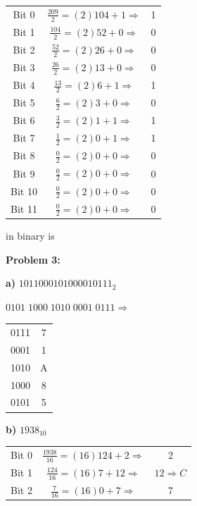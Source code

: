 \documentclass{article}
\begin{document}
    \begin{center}
        \begin{tabular}{ c|c c }
            Bit 0 & $\frac{209}{2} = (2)104 + 1 \Rightarrow$ & 1 \\
            Bit 1 & $\frac{104}{2} = (2)52 + 0 \Rightarrow$ & 0 \\
            Bit 2 & $\frac{52}{2} = (2)26 + 0 \Rightarrow$ & 0 \\
            Bit 3 & $\frac{26}{2} = (2)13 + 0 \Rightarrow$ & 0 \\
            Bit 4 & $\frac{13}{2} = (2)6 + 1 \Rightarrow$ & 1 \\
            Bit 5 & $\frac{6}{2} = (2)3 + 0 \Rightarrow$ & 0 \\
            Bit 6 & $\frac{3}{2} = (2)1 + 1 \Rightarrow$ & 1 \\
            Bit 7 & $\frac{1}{2} = (2)0 + 1 \Rightarrow$ & 1 \\
            Bit 8 & $\frac{0}{2} = (2)0 + 0 \Rightarrow$ & 0 \\
            Bit 9 & $\frac{0}{2} = (2)0 + 0 \Rightarrow$ & 0 \\
            Bit 10 & $\frac{0}{2} = (2)0 + 0 \Rightarrow$ & 0 \\
            Bit 11 & $\frac{0}{2} = (2)0 + 0 \Rightarrow$ & 0
        \end{tabular}
    \end{center}

    \quad{} in binary is 

    \textbf{Problem 3:}

    \quad \textbf{a)} $1011000101000010111_2$

    \quad\quad $0101 \; 1000 \; 1010 \; 0001 \; 0111 \Rightarrow$
    
    \begin{center}
        \begin{tabular}{ c|c }
            0111 & 7 \\
            0001 & 1 \\
            1010 & A \\
            1000 & 8 \\
            0101 & 5
        \end{tabular}
    \end{center}

    \quad\quad {}

    \quad \textbf{b)} $1938_{10}$

    \begin{center}
        \begin{tabular}{ c|c c }
            Bit 0 & $\frac{1938}{16} = (16)124 + 2 \Rightarrow$ & 2 \\
            Bit 1 & $\frac{124}{16} = (16)7 + 12 \Rightarrow$ & $12 \Rightarrow C$ \\
            Bit 2 & $\frac{7}{16} = (16)0 + 7 \Rightarrow$ & 7
        \end{tabular}
    \end{center}
\end{document}
